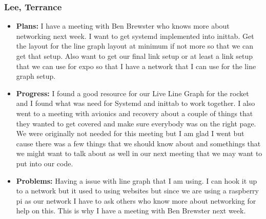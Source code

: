 \documentclass[10pt,draftclsnofoot,onecolumn]{IEEEtran}
\begin{document}
\subsubsection{Lee, Terrance}
\begin{itemize}
	\item \textbf{Plans: }
	I have a meeting with Ben Brewster who knows more about networking next week. I want to get systemd implemented into inittab. Get the layout for the line graph layout at minimum if not more so that we can get that setup. Also want to get our final link setup or at least a link setup that we can use for expo so that I have a network that I can use for the line graph setup.
	\item \textbf{Progress: }
	I found a good resource for our Live Line Graph for the rocket and I found what was need for Systemd and inittab to work together. I also went to a meeting with avionics and recovery about a couple of things that they wanted to get covered and make sure everybody was on the right page. We were originally not needed for this meeting but I am glad I went but cause there was a few things that we should know about and somethings that we might want to talk about as well in our next meeting that we may want to put into our code.
	\item \textbf{Problems: }
	Having a issue with line graph that I am using. I can hook it up to a network but it used to using websites but since we are using a raspberry pi as our network I have to ask others who know more about networking for help on this. This is why I have a meeting with Ben Brewster next week.
\end{itemize}
\end{document}
